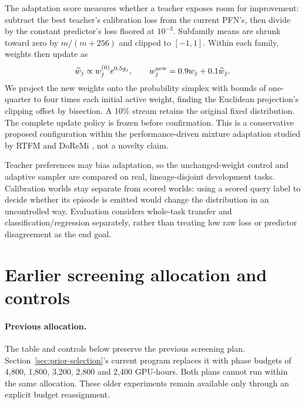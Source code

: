 \documentclass[11pt]{article}
\begin{document}
The adaptation score measures whether a teacher exposes room for improvement: subtract the best teacher's calibration loss from the current PFN's, then divide by the constant predictor's loss floored at $10^{-3}$. Subfamily means are shrunk toward zero by $m/(m+256)$ and clipped to $[-1,1]$. Within each family, weights then update as
\[
\widetilde w_j\propto w_j^{(0)}e^{0.5g_j},\qquad
w_j^{\rm new}=0.9w_j+0.1\widetilde w_j.
\]
We project the new weights onto the probability simplex with bounds of one-quarter to four times each initial active weight, finding the Euclidean projection's clipping offset by bisection. A 10\% stream retains the original fixed distribution. The complete update policy is frozen before confirmation. This is a conservative proposed configuration within the performance-driven mixture adaptation studied by RTFM and DoReMi \cite{rtfm,doremi}, not a novelty claim.

Teacher preferences may bias adaptation, so the unchanged-weight control and adaptive sampler are compared on real, lineage-disjoint development tasks. Calibration worlds stay separate from scored worlds: using a scored query label to decide whether its episode is emitted would change the distribution in an uncontrolled way. Evaluation considers whole-task transfer and classification/regression separately, rather than treating low raw loss or predictor disagreement as the end goal.



\section{Earlier screening allocation and controls}
\label{app:earlier-allocation}

\paragraph{Previous allocation.}
The table and controls below preserve the previous screening plan. Section~\ref{sec:prior-selection}'s current program replaces it with phase budgets of 4,800, 1,800, 3,200, 2,800 and 2,400 GPU-hours. Both plans cannot run within the same allocation. These older experiments remain available only through an explicit budget reassignment.
\end{document}
